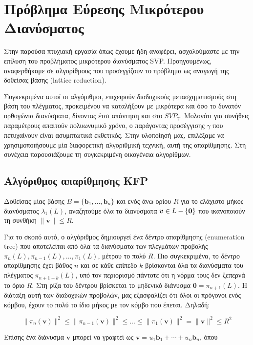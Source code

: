 \section{Πρόβλημα Εύρεσης Μικρότερου Διανύσματος}
\label{chapSVP}

Στην παρούσα πτυχιακή εργασία όπως έχουμε ήδη αναφέρει, ασχολούμαστε με την επίλυση του προβλήματος μικρότερου διανύσματος SVP. Προηγουμένως, αναφερθήκαμε σε αλγορίθμους που προσεγγίζουν το πρόβλημα ως αναγωγή της δοθείσας βάσης (lattice reduction). 

Συγκεκριμένα αυτοί οι αλγόριθμοι, επιχειρούν διαδοχικούς μετασχηματισμούς στη βάση του πλέγματος, προκειμένου να καταλήξουν με μικρότερα και όσο το δυνατόν ορθογώνια διανύσματα, δίνοντας έτσι απάντηση και στο $SVP_\gamma $. Μολονότι για συνήθεις παραμέτρους απαιτούν πολυωνυμικό χρόνο, ο παράγοντας προσέγγισης $ \gamma $ που πετυχαίνουν είναι ασυμπτωτικά εκθετικός. Στην υλοποίησή μας, επιλέξαμε να χρησιμοποιήσουμε μία διαφορετική αλγοριθμική τεχνική, αυτή της απαρίθμησης. Στη συνέχεια παρουσιάζουμε τη συγκεκριμένη οικογένεια αλγορίθμων. 

\subsection{Αλγόριθμος απαρίθμησης \lt KFP}

Δοθείσας μίας βάσης $ B = \{\bm b_1, ..., \bm b_n \} $ και ενός άνω ορίου $ R $ για το ελάχιστο μήκος διανύσματος $ λ_1(L) $, αναζητούμε όλα τα διανύσματα $\bm v \in L - \{{\bf 0}\} $ που ικανοποιούν τη συνθήκη $ \| \bm v \| \leq R $.

Για το σκοπό αυτό, ο αλγόριθμος δημιουργεί ένα δέντρο απαρίθμησης (enumeration tree) που αποτελείται από όλα τα διανύσματα των πλεγμάτων προβολής $ \pi_n(L), \pi_{n-1}(L), ..., \pi_1(L) $, μέτρου το πολύ $ R $. Πιο συγκεκριμένα, το δέντρο απαρίθμησης έχει βάθος $ n $ και σε κάθε επίπεδο $ k $ βρίσκονται όλα τα διανύσματα του πλέγματος $ \pi_{n+1-k}(L) $, υπό τον περιορισμό πάντοτε ότι η νόρμα τους δεν ξεπερνά το όριο $ R $. Στη ρίζα του δέντρου βρίσκεται το μηδενικό διάνυσμα $ \bm 0 = \pi_{n+1}(L) $. Η διάταξη αυτή των διαδοχικών προβολών, μας εξασφαλίζει ότι όλοι οι πρόγονοι ενός κόμβου, έχουν το πολύ το ίδιο μήκος με τον κόμβο που έπεται. Δηλαδή:

$$ \| \pi_n( \bm v) \|^2 \leq \| \pi_{n-1}( \bm v) \|^2 \leq ... \leq \| \pi_1(\bm v) \|^2 = \| \bm v \|^2 \leq R^2 $$

Επίσης ένα διάνυσμα $ \bm v $ μπορεί να γραφτεί ως $ \bm v = u_1 \bm b_1 + \cdots + u_n \bm b_n $, όπου 

